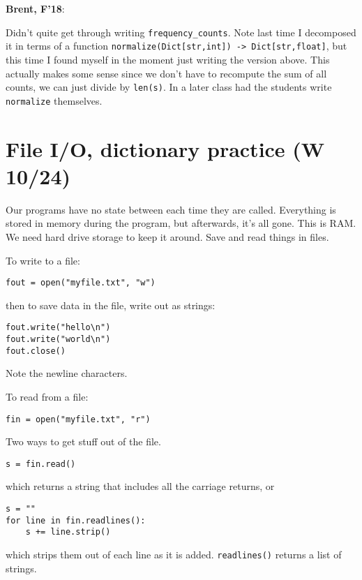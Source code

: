 \documentclass{article}
\newenvironment{reflect}[1]
{
  \noindent
  \begin{lrbox}{\reflectbox}
    \begin{minipage}[t]{\textwidth}
      \textbf{#1}:
}{
    \end{minipage}
  \end{lrbox}
  \fbox{\usebox{\reflectbox}}
}
\newcommand{\notready}{\textcolor{red}{\XSolidBold}\xspace}
\begin{document}
\begin{reflect}{Brent, F'18}
  Didn't quite get through writing \verb|frequency_counts|.  Note last
  time I decomposed it in terms of a function
  \verb|normalize(Dict[str,int]) -> Dict[str,float]|, but this time I
  found myself in the moment just writing the version above.  This
  actually makes some sense since we don't have to recompute the sum
  of all counts, we can just divide by \verb|len(s)|.  In a later
  class had the students write \verb|normalize| themselves.
\end{reflect}

\newpage
\section{\notready File I/O, dictionary practice (W 10/24)}

Our programs have no state between each time they are called.
Everything is stored in memory during the program, but afterwards,
it's all gone.  This is RAM.  We need hard drive storage to keep it
around.  Save and read things in files.

To write to a file:

\begin{verbatim}
fout = open("myfile.txt", "w")
\end{verbatim}

then to save data in the file, write out as strings:

\begin{verbatim}
fout.write("hello\n")
fout.write("world\n")
fout.close()
\end{verbatim}
Note the newline characters.

To read from a file:

\begin{verbatim}
fin = open("myfile.txt", "r")
\end{verbatim}

Two ways to get stuff out of the file.

\begin{verbatim}
s = fin.read()
\end{verbatim}

which returns a string that includes all the carriage returns, or

\begin{verbatim}
s = ""
for line in fin.readlines():
    s += line.strip()
\end{verbatim}

which strips them out of each line as it is added. \verb|readlines()|
returns a list of strings.
\end{document}
